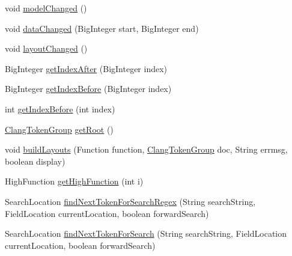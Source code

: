 \begin{DoxyCompactItemize}
void \mbox{\hyperlink{classghidra_1_1app_1_1decompiler_1_1component_1_1_clang_layout_controller_a9a09244ed3c3a82196630c8d4f200318}{model\+Changed}} ()
\item 
void \mbox{\hyperlink{classghidra_1_1app_1_1decompiler_1_1component_1_1_clang_layout_controller_ab846ebc012422ee2c5858eea05b994d7}{data\+Changed}} (Big\+Integer start, Big\+Integer end)
\item 
void \mbox{\hyperlink{classghidra_1_1app_1_1decompiler_1_1component_1_1_clang_layout_controller_a503a1cda7ea741baa1a11c16521dab38}{layout\+Changed}} ()
\item 
Big\+Integer \mbox{\hyperlink{classghidra_1_1app_1_1decompiler_1_1component_1_1_clang_layout_controller_a64fac16316d1a7ebd21941d049be5efc}{get\+Index\+After}} (Big\+Integer index)
\item 
Big\+Integer \mbox{\hyperlink{classghidra_1_1app_1_1decompiler_1_1component_1_1_clang_layout_controller_a4bc132326995a3762a8425ba67ddb280}{get\+Index\+Before}} (Big\+Integer index)
\item 
int \mbox{\hyperlink{classghidra_1_1app_1_1decompiler_1_1component_1_1_clang_layout_controller_ab3a40762e646c1b3fb37f743abd52888}{get\+Index\+Before}} (int index)
\item 
\mbox{\hyperlink{classghidra_1_1app_1_1decompiler_1_1_clang_token_group}{Clang\+Token\+Group}} \mbox{\hyperlink{classghidra_1_1app_1_1decompiler_1_1component_1_1_clang_layout_controller_a71a696ef859d8ef457c3f4e49bdfecc5}{get\+Root}} ()
\item 
void \mbox{\hyperlink{classghidra_1_1app_1_1decompiler_1_1component_1_1_clang_layout_controller_abb22911bb76c7e0b15800541130ce0c1}{build\+Layouts}} (Function function, \mbox{\hyperlink{classghidra_1_1app_1_1decompiler_1_1_clang_token_group}{Clang\+Token\+Group}} doc, String errmsg, boolean display)
\item 
High\+Function \mbox{\hyperlink{classghidra_1_1app_1_1decompiler_1_1component_1_1_clang_layout_controller_a84b76fd7b1014ef8d9e3a7d3a1552acf}{get\+High\+Function}} (int i)
\item 
Search\+Location \mbox{\hyperlink{classghidra_1_1app_1_1decompiler_1_1component_1_1_clang_layout_controller_a74194987b87afc9153d669bcc8bf9453}{find\+Next\+Token\+For\+Search\+Regex}} (String search\+String, Field\+Location current\+Location, boolean forward\+Search)
\item 
Search\+Location \mbox{\hyperlink{classghidra_1_1app_1_1decompiler_1_1component_1_1_clang_layout_controller_a29b3cb592a6102b6f21f158982d3cad0}{find\+Next\+Token\+For\+Search}} (String search\+String, Field\+Location current\+Location, boolean forward\+Search)

\end{DoxyCompactItemize}
